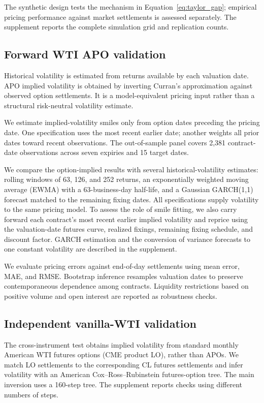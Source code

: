 The synthetic design tests the mechanism in Equation~\eqref{eq:taylor_gap}; empirical pricing performance against market settlements is assessed separately. The supplement reports the complete simulation grid and replication counts.

\subsection{Forward WTI APO validation}

Historical volatility is estimated from returns available by each valuation date. APO implied volatility is obtained by inverting Curran's approximation against observed option settlements. It is a model-equivalent pricing input rather than a structural risk-neutral volatility estimate.

We estimate implied-volatility smiles only from option dates preceding the pricing date. One specification uses the most recent earlier date; another weights all prior dates toward recent observations. The out-of-sample panel covers 2,381 contract-date observations across seven expiries and 15 target dates.

We compare the option-implied results with several historical-volatility estimates: rolling windows of 63, 126, and 252 returns, an exponentially weighted moving average (EWMA) with a 63-business-day half-life, and a Gaussian GARCH(1,1) forecast matched to the remaining fixing dates. All specifications supply volatility to the same pricing model. To assess the role of smile fitting, we also carry forward each contract's most recent earlier implied volatility and reprice using the valuation-date futures curve, realized fixings, remaining fixing schedule, and discount factor. GARCH estimation and the conversion of variance forecasts to one constant volatility are described in the supplement.

We evaluate pricing errors against end-of-day settlements using mean error, MAE, and RMSE. Bootstrap inference resamples valuation dates to preserve contemporaneous dependence among contracts. Liquidity restrictions based on positive volume and open interest are reported as robustness checks.

\subsection{Independent vanilla-WTI validation}\label{sec:external_lo_method}

The cross-instrument test obtains implied volatility from standard monthly American WTI futures options (CME product LO), rather than APOs. We match LO settlements to the corresponding CL futures settlements and infer volatility with an American Cox--Ross--Rubinstein futures-option tree. The main inversion uses a 160-step tree. The supplement reports checks using different numbers of steps.


